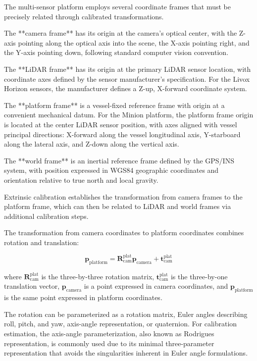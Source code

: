 
The multi-sensor platform employs several coordinate frames that must be precisely related through calibrated transformations.

The **camera frame** has its origin at the camera's optical center, with the Z-axis pointing along the optical axis into the scene, the X-axis pointing right, and the Y-axis pointing down, following standard computer vision convention.

The **LiDAR frame** has its origin at the primary LiDAR sensor location, with coordinate axes defined by the sensor manufacturer's specification.
For the Livox Horizon sensors, the manufacturer defines a Z-up, X-forward coordinate system.

The **platform frame** is a vessel-fixed reference frame with origin at a convenient mechanical datum.
For the Minion platform, the platform frame origin is located at the center LiDAR sensor position, with axes aligned with vessel principal directions: X-forward along the vessel longitudinal axis, Y-starboard along the lateral axis, and Z-down along the vertical axis.

The **world frame** is an inertial reference frame defined by the GPS/INS system, with position expressed in WGS84 geographic coordinates and orientation relative to true north and local gravity.

Extrinsic calibration establishes the transformation from camera frames to the platform frame, which can then be related to LiDAR and world frames via additional calibration steps.


The transformation from camera coordinates to platform coordinates combines rotation and translation:

\begin{equation}
    \mathbf{p}_{\text{platform}} = \mathbf{R}_{\text{cam}}^{\text{plat}} \mathbf{p}_{\text{camera}} + \mathbf{t}_{\text{cam}}^{\text{plat}}    
\end{equation}


where $\mathbf{R}_{\text{cam}}^{\text{plat}}$ is the three-by-three rotation matrix, $\mathbf{t}_{\text{cam}}^{\text{plat}}$ is the three-by-one translation vector, $\mathbf{p}_{\text{camera}}$ is a point expressed in camera coordinates, and $\mathbf{p}_{\text{platform}}$ is the same point expressed in platform coordinates.

The rotation can be parameterized as a rotation matrix, Euler angles describing roll, pitch, and yaw, axis-angle representation, or quaternion.
For calibration estimation, the axis-angle parameterization, also known as Rodrigues representation, is commonly used due to its minimal three-parameter representation that avoids the singularities inherent in Euler angle formulations.

